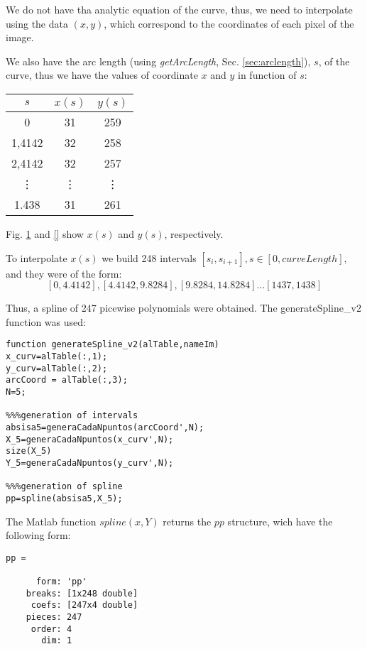 \documentclass{ws-procs9x6}
\begin{document}
We do not have tha analytic equation of the curve, thus, we need to
interpolate using the data $(x,y)$, which correspond to the
coordinates of each pixel of the image.

We also have the arc length (using \emph{getArcLength},
Sec. \ref{sec:arclength}), $s$, of the curve, thus we have the values
of coordinate $x$ and $y$ in function of $s$:

\begin{center}
\begin{tabular}{c c c }\\\hline
$s$ &$x(s)$ & $y(s)$  \\\hline
0 &31 &259  \\\hline
1,4142 &32 &258  \\\hline
2,4142 & 32 &257  \\\hline
\vdots &\vdots &\vdots \\\hline
1.438 &31 & 261 \\\hline
\end{tabular}
\end{center}

Fig. \ref{fig:x-s} and \ref{} show $x(s)$ and $y(s)$, respectively.

\begin{figure}
\centering
{}
\label{fig:x-s}
\end{figure}

\begin{figure}
\centering
{}
\label{fig:y-s}
\end{figure}

To interpolate $x(s)$ we build 248 intervals $[s_{i},s_{i+1}], s \in
[0,curveLength]$, and they were of the form:
$$[0,4.4142], [4.4142, 9.8284], [9.8284, 14.8284] \dots [1437,1438]$$

Thus, a spline of  247 picewise polynomials were obtained. The generateSpline\_v2 function was used:

\begin{verbatim}
function generateSpline_v2(alTable,nameIm)
x_curv=alTable(:,1);
y_curv=alTable(:,2);
arcCoord = alTable(:,3);
N=5;

%%%generation of intervals
absisa5=generaCadaNpuntos(arcCoord',N);
X_5=generaCadaNpuntos(x_curv',N);
size(X_5)
Y_5=generaCadaNpuntos(y_curv',N);

%%%generation of spline
pp=spline(absisa5,X_5);
\end{verbatim}

The Matlab function $spline(x,Y)$ returns the $pp$ structure, wich have the following form:
\begin{verbatim}
pp = 

      form: 'pp'
    breaks: [1x248 double]
     coefs: [247x4 double]
    pieces: 247
     order: 4
       dim: 1
\end{verbatim}
\end{document}
